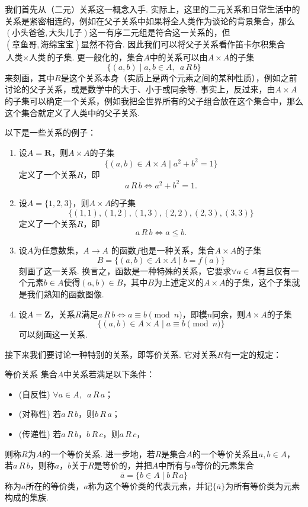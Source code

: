 我们首先从（二元）关系这一概念入手. 实际上，这里的二元关系和日常生活中的关系是紧密相连的，例如在父子关系中如果将全人类作为谈论的背景集合，那么$(\text{小头爸爸}, \text{大头儿子})$这一有序二元组是符合这一关系的，但$(\text{章鱼哥}, \text{海绵宝宝})$显然不符合. 因此我们可以将父子关系看作笛卡尔积集合$\text{人类}\times\text{人类}$的子集. 更一般化的，集合$A$中的关系可以由$A\times A$的子集
\[\{(a,b) \mid a,b\in A, \enspace a\,R\,b\}\]
来刻画，其中$R$是这个关系本身（实质上是两个元素之间的某种性质），例如之前讨论的父子关系，或是数学中的大于、小于或同余等. 事实上，反过来，由$A\times A$的子集可以确定一个关系，例如我把全世界所有的父子组合放在这个集合中，那么这个集合就定义了人类中的父子关系.
\begin{example}{}{}
    以下是一些关系的例子：
    \begin{enumerate}
        \item 设$A=\mathbf{R}$，则$A\times A$的子集
              \[\{(a,b)\in A\times A \mid a^2+b^2=1\}\]
              定义了一个关系$R$，即
              \[a\,R\,b \iff a^2+b^2=1.\]

        \item 设$A=\{1,2,3\}$，则$A\times A$的子集
              \[\{(1,1),(1,2),(1,3),(2,2),(2,3),(3,3)\}\]
              定义了一个关系$R$，即
              \[a\,R\,b \iff a\leqslant b.\]

        \item 设$A$为任意数集，$A\to A$ 的函数$f$也是一种关系，集合$A\times A$的子集
              \[B=\{(a,b)\in A\times A \mid b=f(a)\}\]
              刻画了这一关系. 换言之，函数是一种特殊的关系，它要求$\forall a\in A$有且仅有一个元素$b\in A$使得$(a,b)\in B$，其中$B$为上述定义的$A\times A$的子集，这个子集就是我们熟知的函数图像.

        \item 设$A=\mathbf{Z}$，关系$R$满足$a\,R\,b\iff a\equiv b \pmod n$，即模$n$同余，则$A\times A$的子集
              \[\{(a,b)\in A\times A \mid a\equiv b \pmod n\}\]
              可以刻画这一关系.
    \end{enumerate}
\end{example}

接下来我们要讨论一种特别的关系，即等价关系. 它对关系$R$有一定的规定：
\begin{definition}{}{等价关系}
    集合$A$中关系若满足以下条件：
    \begin{itemize}
        \item (自反性) $\forall a\in A, \enspace a\,R\,a$；

        \item (对称性) 若$a\,R\,b$，则$b\,R\,a$；

        \item (传递性) 若$a\,R\,b$，$b\,R\,c$，则$a\,R\,c$，
    \end{itemize}
    则称$R$为$A$的一个等价关系. 进一步地，若$R$是集合$A$的一个等价关系且$a,b\in A$，若$a\,R\,b$，则称$a$，$b$关于$R$是等价的，并把$A$中所有与$a$等价的元素集合
    \[\overline{a}=\{b\in A \mid b\,R\,a\}\]
    称为$a$所在的等价类，$a$称为这个等价类的代表元素，并记$\{\overline{a}\}$为所有等价类为元素构成的集族.
\end{definition}

